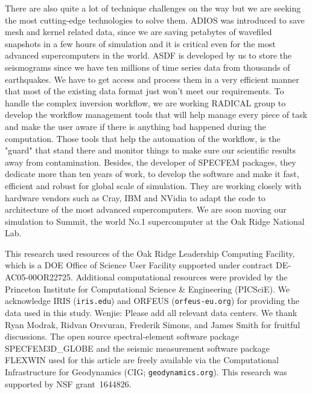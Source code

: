 \documentclass[extra,mreferee]{gji}
\begin{document}
There are also quite a lot of technique challenges on the way but we are seeking
the most cutting-edge technologies to solve them. ADIOS was introduced to save mesh
and kernel related data, since we are saving petabytes of wavefiled snapshots
in a few hours of simulation and it is critical even for the most advanced
supercomputers in the world. ASDF is developed by us to store the seismograms
since we have ten millions of time series data from thousands of earthquakes.
We have to get access and process them in a very efficient manner that most of
the existing data format just won't meet our requirements. To handle the complex
inversion workflow, we are working RADICAL group to develop the workflow management
tools that will help manage every piece of task and make the user aware if there
is anything bad happened during the computation. Those tools that help the
automation of the workflow, is the "guard" that stand there and monitor things
to make sure our scientific results away from contamination. Besides, the
developer of SPECFEM packages, they dedicate more than ten years of work,
to develop the software and make it fast, efficient and robust for global scale of simulation.
They are working closely with hardware vendors such as Cray, IBM and NVidia to adapt
the code to architecture of the most advanced supercomputers. We are soon
moving our simulation to Summit, the world No.1 supercomputer at the Oak Ridge
National Lab.

\begin{acknowledgments}


This research used resources of the Oak Ridge Leadership Computing Facility, which is a DOE Office of Science User Facility supported under contract DE-AC05-00OR22725.
Additional computational resources were provided by the Princeton Institute for Computational Science \& Engineering (PICSciE).
We acknowledge IRIS ({\tt iris.edu}) and ORFEUS ({\tt orfeus-eu.org}) for providing the data used in this study.
{\color{red} Wenjie: Please add all relevant data centers.} We thank Ryan Modrak, Ridvan Orsvuran, Frederik Simons, and James Smith for fruitful discussions.
The open source spectral-element software package SPECFEM3D\_GLOBE and the seismic measurement software package FLEXWIN used for this article are freely available via the Computational Infrastructure for Geodynamics (CIG; {\tt geodynamics.org}). This research was supported by NSF grant~1644826.

\end{acknowledgments}
\end{document}
